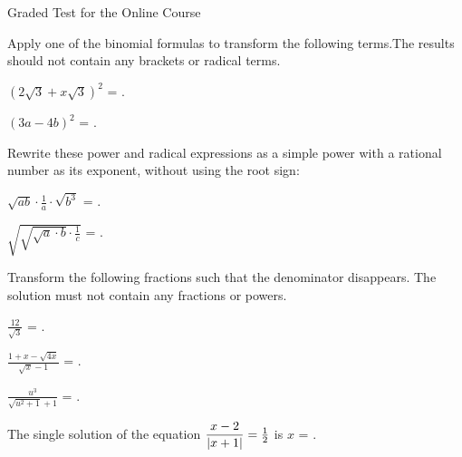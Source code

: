 \begin{MTest}{Graded Test for the Online Course}
\begin{MExercise}
Apply one of the binomial formulas to transform the following terms.The results should not contain any brackets or radical terms.
\begin{MExerciseItems}
\item{$(2\sqrt3+x\sqrt3)^2$ = .}
\item{$(3a-4b)^2$ = .}
\end{MExerciseItems}
\end{MExercise}

\begin{MExercise}
Rewrite these power and radical expressions as a simple power with a rational number as its exponent, without using the root sign:
\begin{MExerciseItems}
\item{$\sqrt{a b}\cdot \frac1{a}\cdot \sqrt{b^{3}}$ = .}
\item{$\sqrt{\sqrt{\sqrt{a}\cdot b}\cdot\frac1c}$ = .}
\end{MExerciseItems}
\end{MExercise}

\begin{MExercise}
Transform the following fractions such that the denominator disappears. The solution must not contain any fractions or powers.
\begin{MExerciseItems}
\item{$\frac{12}{\sqrt{3}}$ = .}
\item{$\frac{1+x-\sqrt{4x}}{\sqrt{x}-1}$ = .}
\item{$\frac{u^3}{\sqrt{u^2+1}+1}$ = .}
\end{MExerciseItems}
\end{MExercise}

\begin{MExercise}
The single solution of the equation $\dfrac{x-2}{|x+1|}=\frac12$ is $x$ = . %
\end{MExercise}


\end{MTest}
